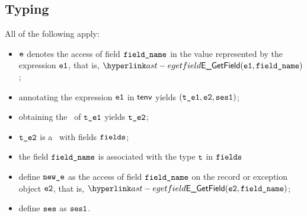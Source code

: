 \subsection{Typing}
\ProseParagraph
All of the following apply:
\begin{itemize}
  \item $\ve$ denotes the access of field $\fieldname$ in the value represented by the expression $\veone$, that is, $\EGetField(\veone, \fieldname)$;
  \item annotating the expression $\veone$ in $\tenv$ yields $(\vteone, \vetwo, \vsesone)$\ProseOrTypeError;
  \item obtaining the \underlyingtype\ of $\vteone$ yields $\vtetwo$\ProseOrTypeError;
  \item $\vtetwo$ is a \structuredtype\ with fields $\fields$;
  \item the field $\fieldname$ is associated with the type $\vt$ in $\fields$
  \item define $\newe$ as the access of field $\fieldname$ on the record or exception object $\vetwo$, that is, $\EGetField(\vetwo, \fieldname)$;
  \item define $\vses$ as $\vsesone$.
\end{itemize}
\FormallyParagraph
\begin{mathpar}
\end{mathpar}

